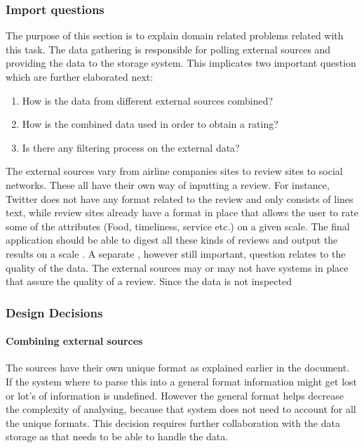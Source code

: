 \documentclass{article}
\begin{document}
\subsubsection{Import questions}
The purpose of this section is to explain domain related problems related with this task. The data gathering is responsible for polling external sources and providing the data to the storage system. This implicates two important question which are further elaborated next:
\begin{enumerate}
\item	How is the data from different external sources combined?
\item	How is the combined data used in order to obtain a rating?
\item	Is there any filtering process on the external data?
\end{enumerate}
The external sources vary from airline companies sites to review sites to social networks. These all have their own way of inputting a review. For instance, Twitter does not have any format related to the review and only consists of lines text, while review sites already have  a format in place that allows the user to rate some of the attributes (Food, timeliness, service etc.) on a given scale. The final application should be able to digest all these kinds of reviews and output the results on a scale . 
A separate , however still important, question relates to the quality of the data. The external sources may or may not have systems in place that assure the quality of a review. Since the data is not inspected 

\subsubsection{Design Decisions}

\paragraph{Combining external sources}
The sources have their own unique format as explained earlier in the document. If the system where to parse this into a general format information might get lost or lot's of information is undefined.
However the general format helps decrease the complexity of analysing, because that system does not need to account for all the unique formats. This decision requires further collaboration with the data storage
as that needs to be able to handle the data. 
\end{document}
